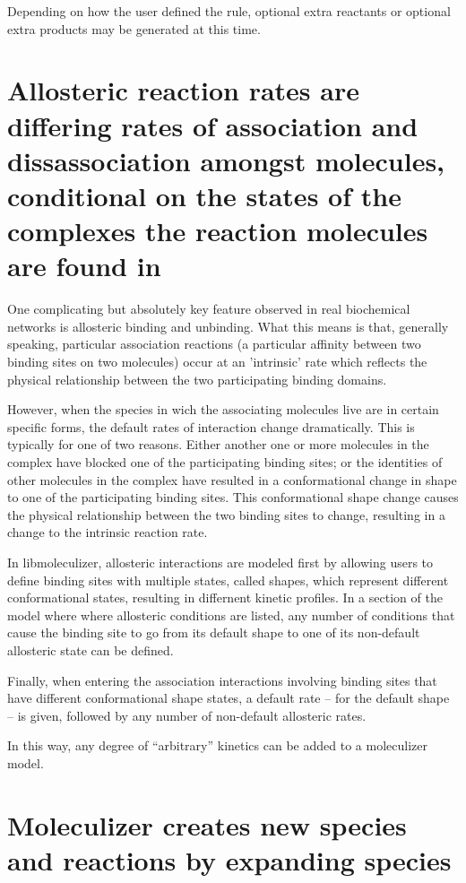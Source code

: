 Depending on how the user defined the rule, optional extra reactants
or optional extra products may be generated at this time.  

\section{Allosteric reaction rates are differing rates of association
  and dissassociation amongst molecules, conditional on the states of
  the complexes the reaction molecules are found in}  

One complicating but absolutely key feature observed in real
biochemical networks is allosteric binding and unbinding.  What this
means is that, generally speaking, particular association reactions (a
particular affinity between two binding sites on two molecules) occur
at an 'intrinsic' rate which reflects the physical relationship
between the two participating binding domains.  

However, when the species in wich the associating molecules live are
in certain specific forms, the default rates of interaction change
dramatically. This is typically for one of two reasons.  Either
another one or more molecules in the complex have blocked one of the
participating binding sites; or the identities of other molecules in
the complex have resulted in a conformational change in shape to one
of the participating binding sites.  This conformational shape change
causes the physical relationship between the two binding sites to
change, resulting in a change to the intrinsic reaction rate.  

In libmoleculizer, allosteric interactions are modeled first by
allowing users to define binding sites with multiple states, called
shapes, which represent different conformational states, resulting in
differnent kinetic profiles.  In a section of the model where where
allosteric conditions are listed, any number of conditions that cause
the binding site to go from its default shape to one of its
non-default allosteric state can be defined.

Finally, when entering the association interactions involving binding
sites that have different conformational shape states, a default rate
-- for the default shape -- is given, followed by any number of
non-default allosteric rates.

In this way, any degree of ``arbitrary'' kinetics can be added to a
moleculizer model.


\section{Moleculizer creates new species and reactions by expanding
  species}

